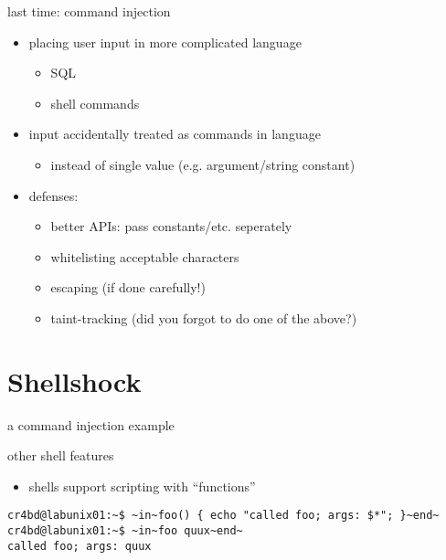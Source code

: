 \begin{frame}
    \titlepage
\end{frame}


\begin{frame}{last time: command injection}
    \begin{itemize}
        \item placing user input in more complicated language
            \begin{itemize}
            \item SQL
            \item shell commands
            \end{itemize}
        \item input accidentally treated as commands in language
            \begin{itemize}
            \item instead of single value (e.g. argument/string constant)
            \end{itemize}
        \item defenses:
            \begin{itemize}
            \item better APIs: pass constants/etc. seperately
            \item whitelisting acceptable characters
            \item escaping (if done carefully!)
            \item taint-tracking (did you forgot to do one of the above?)
            \end{itemize}
    \end{itemize}
\end{frame}


\section{Shellshock}

\begin{frame}{a command injection example}
\end{frame}

\begin{frame}[fragile,label=shellShock]{other shell features}
\begin{itemize}
    \item shells support scripting with ``functions''
\end{itemize}
\begin{lstlisting}
cr4bd@labunix01:~$ ~in~foo() { echo "called foo; args: $*"; }~end~
cr4bd@labunix01:~$ ~in~foo quux~end~
called foo; args: quux
\end{lstlisting}
\end{frame}

